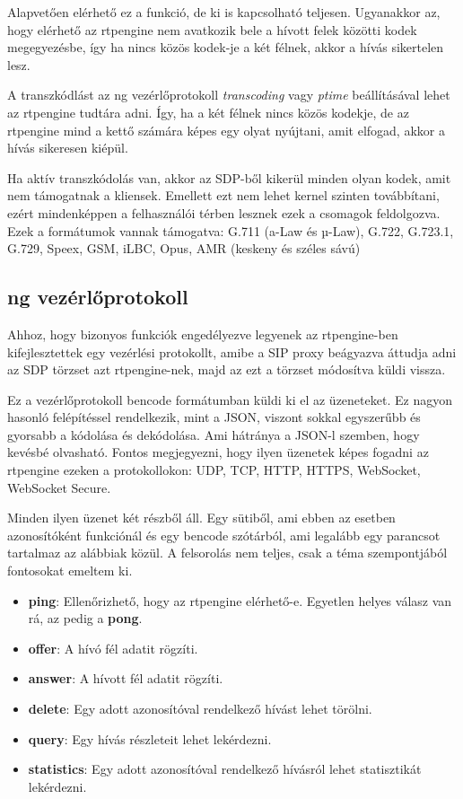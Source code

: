Alapvetően elérhető ez a funkció, de ki is kapcsolható teljesen. Ugyanakkor az, hogy 
elérhető az rtpengine nem avatkozik bele a hívott felek közötti kodek megegyezésbe, 
így ha nincs közös kodek-je a két félnek, akkor a hívás sikertelen lesz.

A transzkódlást az ng vezérlőprotokoll \textit{transcoding} vagy \textit{ptime} beállításával
lehet az rtpengine tudtára adni. Így, ha a két félnek nincs közös kodekje, de az rtpengine
mind a kettő számára képes egy olyat nyújtani, amit elfogad, akkor a hívás sikeresen kiépül.

Ha aktív transzkódolás van, akkor az SDP-ből kikerül minden olyan kodek, amit nem támogatnak
a kliensek. Emellett ezt nem lehet kernel szinten továbbítani, ezért mindenképpen a 
felhasználói térben lesznek ezek a csomagok feldolgozva. \\

Ezek a formátumok vannak támogatva: G.711 (a-Law és µ-Law), G.722, G.723.1, G.729, Speex, 
GSM, iLBC, Opus, AMR (keskeny és széles sávú)

\subsection{ng vezérlőprotokoll}

Ahhoz, hogy bizonyos funkciók engedélyezve legyenek az rtpengine-ben kifejlesztettek 
egy vezérlési protokollt, amibe a SIP proxy beágyazva áttudja adni az SDP törzset 
azt rtpengine-nek, majd az ezt a törzset módosítva küldi vissza. 

Ez a vezérlőprotokoll bencode formátumban küldi ki el az üzeneteket. Ez nagyon hasonló
felépítéssel rendelkezik, mint a JSON, viszont sokkal egyszerűbb és gyorsabb a kódolása 
és dekódolása. Ami hátránya a JSON-l szemben, hogy kevésbé olvasható. Fontos 
megjegyezni, hogy ilyen üzenetek képes fogadni az rtpengine ezeken a protokollokon: 
UDP, TCP, HTTP, HTTPS, WebSocket, WebSocket Secure. 

Minden ilyen üzenet két részből áll. Egy sütiből, ami ebben az esetben azonosítóként
funkciónál és egy bencode szótárból, ami legalább egy parancsot tartalmaz az 
alábbiak közül. A felsorolás nem teljes, csak a téma szempontjából fontosokat 
emeltem ki.

\begin{itemize}
	\item \textbf{ping}: Ellenőrizhető, hogy az rtpengine elérhető-e. Egyetlen helyes 
	válasz van rá, az pedig a \textbf{pong}.
	\item \textbf{offer}: A hívó fél adatit rögzíti.
	\item \textbf{answer}: A hívott fél adatit rögzíti. 
	\item \textbf{delete}: Egy adott azonosítóval rendelkező hívást lehet törölni.
	\item \textbf{query}: Egy hívás részleteit lehet lekérdezni. 
	\item \textbf{statistics}: Egy adott azonosítóval rendelkező hívásról lehet statisztikát
	lekérdezni. 
\end{itemize} 


